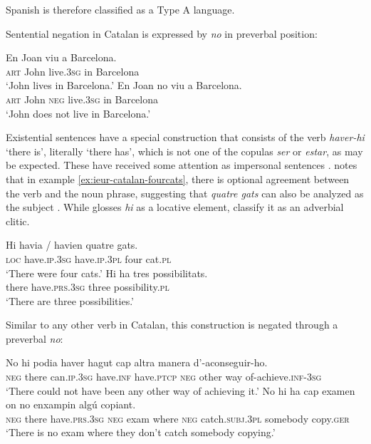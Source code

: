 \documentclass[output=paper,colorlinks,citecolor=brown]{langscibook}
\begin{document}
\begin{paperappendix}
\begin{unindented}
Spanish is therefore classified as a Type A language. 

\largerpage
Sentential negation in Catalan is expressed by \textit{no} in preverbal position: 
%
\begin{exe}\ex \gll En Joan viu a Barcelona. \\
\textsc{art} John  live.\textsc{3sg} in Barcelona \\
    \glt `John lives in Barcelona.' \citep[154]{Hualde1992}
\ex \gll En Joan  no viu a Barcelona. \\
\textsc{art} John  \textsc{neg} live.\textsc{3sg} in Barcelona \\
    \glt `John does not live in Barcelona.' \citep[154]{Hualde1992}
    \end{exe}

Existential sentences have a special construction that consists of the verb
\textit{haver-hi} `there is', literally `there has', which is not one of
the copulas \textit{ser} or \textit{estar}, as may be expected. These have
received some attention as impersonal sentences \parencites[81]{Hualde1992}
[460]{WheelerYates1999}. \citet[81]{Hualde1992} notes that in example
\ref{ex:ieur-catalan-fourcats},
there is optional agreement between the verb and the noun phrase,
suggesting that \textit{quatre gats} can also be analyzed as the subject
\parencite[see also][460]{WheelerYates1999}. While \citet{Hualde1992} glosses \textit{hi} as a locative element, \citet[460]{WheelerYates1999} classify it as an adverbial clitic. 
%
\begin{exe}\ex\label{ex:ieur-catalan-fourcats} \gll Hi havia / havien quatre gats. \\
\textsc{loc} have.\textsc{ip.3sg} {} have.\textsc{ip.3pl} four cat.\textsc{pl} \\
    \glt `There were four cats.' \citep[81]{Hualde1992}
\ex \gll Hi ha tres possibilitats.  \\
there have.\textsc{prs.3sg} three  possibility.\textsc{pl} \\
    \glt `There are three possibilities.' \parencite[460]{WheelerYates1999}
    \end{exe}

Similar to any other verb in Catalan, this construction is negated through a preverbal \textit{no}: 
%
\begin{exe}\ex \gll No hi podia haver hagut cap  altra manera d’-aconseguir-ho. \\
\textsc{neg} there can.\textsc{ip.3sg} have.\textsc{inf} have.\textsc{ptcp} \textsc{neg} other way of-achieve.\textsc{inf-3sg} \\
    \glt `There could not have been any other way of achieving it.'
\parencite[460]{WheelerYates1999}
\ex \gll No hi ha cap examen on no enxampin algú copiant.  \\
\textsc{neg} there have.\textsc{prs.3sg} \textsc{neg} exam     where \textsc{neg} catch.\textsc{subj.3pl} somebody copy.\textsc{ger} \\
    \glt `There is no exam where they don't catch somebody copying.' \parencite[422]{WheelerYates1999}
    \end{exe}


\end{unindented}
\end{paperappendix}
\end{document}

